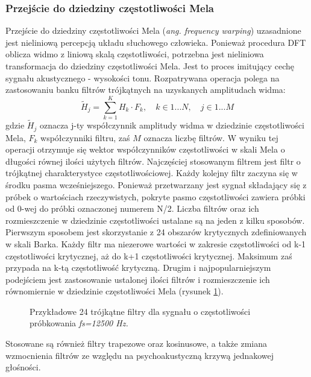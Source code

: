 \subsubsection{Przejście do dziedziny częstotliwości Mela}
Przejście do dziedziny częstotliwości Mela (\textit{ang. frequency warping}) uzasadnione jest nieliniową percepcją układu słuchowego człowieka. Ponieważ procedura DFT oblicza widmo z liniową skalą częstotliwości, potrzebna jest nieliniowa transformacja do dziedziny częstotliwości Mela. Jest to proces imitujący cechę sygnału akustycznego - wysokości tonu.
Rozpatrywana operacja polega na zastosowaniu banku filtrów trójkątnych na uzyskanych amplitudach widma:
\begin{equation}
  \tilde{H}_j = \sum_{k=1}^{K} H_k \cdot F_k, \quad k \in {1...N}, \quad  j \in {1...M}
\end{equation}
gdzie $\tilde{H}_j$ oznacza j-ty współczynnik amplitudy widma w dziedzinie częstotliwości Mela, $F_k$ współczynniki filtru, zaś $M$ oznacza liczbę filtrów.
W wyniku tej operacji otrzymuje się wektor współczynników częstotliwości w skali Mela o długości równej ilości użytych filtrów. Najczęściej stosowanym filtrem jest filtr o trójkątnej charakterystyce częstotliwościowej. Każdy kolejny filtr zaczyna się w środku pasma wcześniejszego. Ponieważ przetwarzany jest sygnał składający się z próbek o wartościach rzeczywistych, pokryte pasmo częstotliwości zawiera próbki od 0-wej do próbki oznaczonej numerem N/2. Liczba filtrów oraz ich rozmieszczenie w dziedzinie częstotliwości ustalane są na jeden z kilku sposobów.
Pierwszym sposobem jest skorzystanie z 24 obszarów krytycznych zdefiniowanych w skali Barka. Każdy filtr ma niezerowe wartości w zakresie częstotliwości od k-1 częstotliwości krytycznej, aż do k+1 częstotliwości krytycznej. Maksimum zaś przypada na k-tą częstotliwość krytyczną.
Drugim i najpopularniejszym podejściem jest zastosowanie ustalonej ilości filtrów i rozmieszczenie ich równomiernie w dziedzinie częstotliwości Mela (rysunek \ref{melfb}).

\begin{figure}
  \centering
    
    \label{melfb}
    \caption{Przykładowe 24 trójkątne filtry dla sygnału o częstotliwości próbkowania \textit{fs=12500 Hz.}}
\end{figure}

Stosowane są również filtry trapezowe oraz kosinusowe, a także zmiana wzmocnienia filtrów ze względu na psychoakustyczną krzywą jednakowej głośności. 

